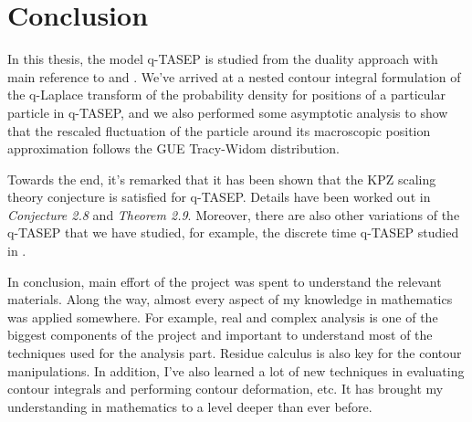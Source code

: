 \chapter{Conclusion}
In this thesis, the model q-TASEP is studied from the duality approach with main reference to \cite{duality2014} and \cite{asymptotics2013}. We've arrived at a nested contour integral formulation of the q-Laplace transform of the probability density for positions of a particular particle in q-TASEP, and we also performed some asymptotic analysis to show that the rescaled fluctuation of the particle around its macroscopic position approximation follows the GUE Tracy-Widom distribution.

Towards the end, it's remarked that it has been shown that the KPZ scaling theory conjecture is satisfied for q-TASEP. Details have been worked out in \cite{asymptotics2013} \textit{Conjecture 2.8} and \textit{Theorem 2.9}. Moreover, there are also other variations of the q-TASEP that we have studied, for example, the discrete time q-TASEP studied in \cite{discreteqtasep}.

In conclusion, main effort of the project was spent to understand the relevant materials. Along the way, almost every aspect of my knowledge in mathematics was applied somewhere. For example, real and complex analysis is one of the biggest components of the project and important to understand most of the techniques used for the analysis part. Residue calculus is also key for the contour manipulations. In addition, I've also learned a lot of new techniques in evaluating contour integrals and performing contour deformation, etc. It has brought my understanding in mathematics to a level deeper than ever before. 